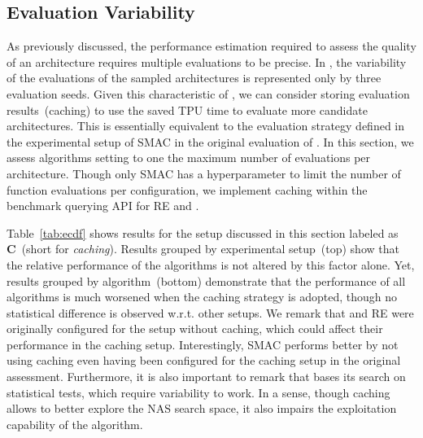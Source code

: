 \subsection{Evaluation Variability }
\label{sec:caching}
As previously discussed, the performance estimation required to assess the quality of an architecture requires multiple evaluations to be precise. 
In \nasbench, the variability of the evaluations of the sampled architectures is represented only by three evaluation seeds. 
Given this characteristic of \nasbench, we can consider storing evaluation results~(caching) to use the saved TPU time to evaluate more candidate architectures. 
This is essentially equivalent to the evaluation strategy defined in the experimental setup of SMAC in the original evaluation of \nasbench. In this section, we assess algorithms setting to one the maximum number of evaluations per architecture.
Though only SMAC has a hyperparameter to limit the number of function evaluations per configuration, we implement caching within the benchmark querying API for RE and \irace. 

Table~\ref{tab:ecdf} shows results for the setup discussed in this section labeled as \textbf{C}~(short for \textit{caching}). 
Results grouped by experimental setup~(top) show that the relative performance of the algorithms is not altered by this factor alone. Yet, results grouped by algorithm~(bottom) demonstrate that the performance of all algorithms is much worsened when the caching strategy is adopted, though no statistical difference is observed w.r.t. other setups. We remark that \irace and RE were originally configured for the setup without caching, which could affect their performance in the caching setup. Interestingly, SMAC performs better by not using caching even having been configured for the caching setup in the original \nasbench assessment. Furthermore, it is also important to remark that \irace bases its search on statistical tests, which require variability to work. In a sense, though caching allows \irace to better explore the NAS search space, it also impairs the exploitation capability of the algorithm.

